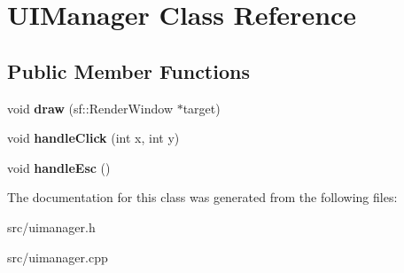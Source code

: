 \hypertarget{class_u_i_manager}{}\section{U\+I\+Manager Class Reference}
\label{class_u_i_manager}
\subsection*{Public Member Functions}
\begin{DoxyCompactItemize}
\item 
\hypertarget{class_u_i_manager_a93440991c435364a9f5b45af839255cb}{}void {\bfseries draw} (sf\+::\+Render\+Window $\ast$target)\label{class_u_i_manager_a93440991c435364a9f5b45af839255cb}

\item 
\hypertarget{class_u_i_manager_a847b80aeee2eac2ab2680b0346b33ef1}{}void {\bfseries handle\+Click} (int x, int y)\label{class_u_i_manager_a847b80aeee2eac2ab2680b0346b33ef1}

\item 
\hypertarget{class_u_i_manager_a247345c268729bc04b5d903a94ccdeaf}{}void {\bfseries handle\+Esc} ()\label{class_u_i_manager_a247345c268729bc04b5d903a94ccdeaf}

\end{DoxyCompactItemize}


The documentation for this class was generated from the following files\+:\begin{DoxyCompactItemize}
\item 
src/uimanager.\+h\item 
src/uimanager.\+cpp\end{DoxyCompactItemize}

